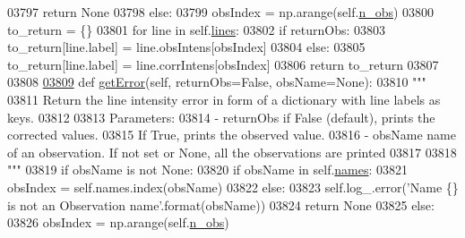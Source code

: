 \begin{DoxyCode}
{{{{{{{{{{{{{{{{{{{{{{03797                 \textcolor{keywordflow}{return} \textcolor{keywordtype}{None}
03798         \textcolor{keywordflow}{else}:
03799             obsIndex = np.arange(self.\hyperlink{classpyneb_1_1core_1_1pynebcore_1_1_observation_aef2877f7f50f5c70cee1f0da97b34081}{n\_obs})
03800         to\_return = \{\}
03801         \textcolor{keywordflow}{for} line \textcolor{keywordflow}{in} self.\hyperlink{classpyneb_1_1core_1_1pynebcore_1_1_observation_a78332043ca9f290590edf6b8a1e5b767}{lines}:
03802             \textcolor{keywordflow}{if} returnObs:
03803                 to\_return[line.label] = line.obsIntens[obsIndex]
03804             \textcolor{keywordflow}{else}:
03805                 to\_return[line.label] = line.corrIntens[obsIndex]
03806         \textcolor{keywordflow}{return} to\_return
03807     
03808     
\hypertarget{pynebcore_8py_source_l03809}{}\hyperlink{classpyneb_1_1core_1_1pynebcore_1_1_observation_a96cf2360b9b568a675d2c8177d47b3d2}{03809}     \textcolor{keyword}{def }\hyperlink{classpyneb_1_1core_1_1pynebcore_1_1_observation_a96cf2360b9b568a675d2c8177d47b3d2}{getError}(self, returnObs=False, obsName=None):
03810         \textcolor{stringliteral}{"""}
03811 \textcolor{stringliteral}{        Return the line intensity error in form of a dictionary with line labels as keys.}
03812 \textcolor{stringliteral}{        }
03813 \textcolor{stringliteral}{        Parameters:}
03814 \textcolor{stringliteral}{            - returnObs  if False (default), prints the corrected values. }
03815 \textcolor{stringliteral}{                            If True, prints the observed value. }
03816 \textcolor{stringliteral}{            - obsName    name of an observation. If not set or None, all the observations are printed}
03817 \textcolor{stringliteral}{            }
03818 \textcolor{stringliteral}{        """}
03819         \textcolor{keywordflow}{if} obsName \textcolor{keywordflow}{is} \textcolor{keywordflow}{not} \textcolor{keywordtype}{None}:
03820             \textcolor{keywordflow}{if} obsName \textcolor{keywordflow}{in} self.\hyperlink{classpyneb_1_1core_1_1pynebcore_1_1_observation_a3f365d0b1488b2eba300bf71caf23c17}{names}:
03821                 obsIndex = self.names.index(obsName)
03822             \textcolor{keywordflow}{else}:
03823                 self.log\_.error(\textcolor{stringliteral}{'Name \{\} is not an Observation name'}.format(obsName))
03824                 \textcolor{keywordflow}{return} \textcolor{keywordtype}{None}
03825         \textcolor{keywordflow}{else}:
03826             obsIndex = np.arange(self.\hyperlink{classpyneb_1_1core_1_1pynebcore_1_1_observation_aef2877f7f50f5c70cee1f0da97b34081}{n\_obs})
}}}}}}}}}}}}}}}}}}}}}}
\end{DoxyCode}
